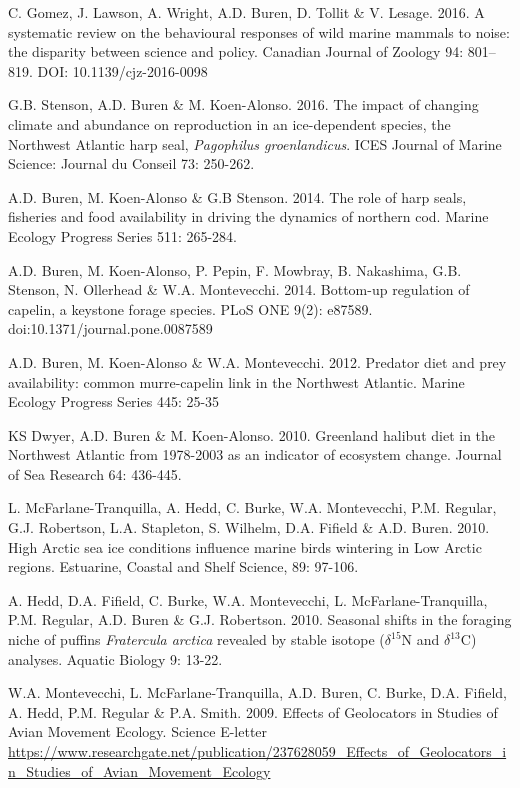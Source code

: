 \documentclass{res}
\begin{document}
\begin{resume}
\begin{hangparas}{.4in}{1}
C. Gomez, J. Lawson, A. Wright, A.D. Buren, D. Tollit \& V. Lesage. 2016. A systematic review on the behavioural responses of wild marine mammals to noise: the disparity between science and policy. Canadian Journal of Zoology 94: 801–819. DOI: 10.1139/cjz-2016-0098

\pagebreak

G.B. Stenson, A.D. Buren \& M. Koen-Alonso. 2016. The impact of changing climate and abundance on reproduction in an ice-dependent species, the Northwest Atlantic harp seal, \textit{Pagophilus groenlandicus}. ICES Journal of Marine Science: Journal du Conseil 73: 250-262.

A.D. Buren, M. Koen-Alonso \& G.B Stenson. 2014. The role of harp seals, fisheries and food availability in driving the dynamics of northern cod. Marine Ecology Progress Series 511: 265-284.

A.D. Buren, M. Koen-Alonso, P. Pepin, F. Mowbray, B. Nakashima, G.B. Stenson, N. Ollerhead \& W.A. Montevecchi. 2014. Bottom-up regulation of capelin, a keystone forage species. PLoS ONE 9(2): e87589. doi:10.1371/journal.pone.0087589

A.D. Buren, M. Koen-Alonso \& W.A. Montevecchi. 2012. Predator diet and prey availability: common murre-capelin link in the Northwest Atlantic. Marine Ecology Progress Series 445: 25-35

KS Dwyer, A.D. Buren \& M. Koen-Alonso. 2010. Greenland halibut diet in the Northwest Atlantic from 1978-2003 as an indicator of ecosystem change. Journal of Sea Research 64: 436-445. 

L. McFarlane-Tranquilla, A. Hedd, C. Burke, W.A. Montevecchi, P.M. Regular, G.J. Robertson, L.A. Stapleton, S. Wilhelm, D.A. Fifield \& A.D. Buren. 2010. High Arctic sea ice conditions influence marine birds wintering in Low Arctic regions. Estuarine, Coastal and Shelf Science, 89: 97-106.

A. Hedd, D.A. Fifield, C. Burke, W.A. Montevecchi, L. McFarlane-Tranquilla, P.M. Regular, A.D. Buren \& G.J. Robertson. 2010. Seasonal shifts in the foraging niche of puffins \textit{Fratercula arctica} revealed by stable isotope ($\delta^{15}$N and $\delta^{13}$C) analyses. Aquatic Biology 9: 13-22.

W.A. Montevecchi, L. McFarlane-Tranquilla, A.D. Buren, C. Burke, D.A. Fifield, A. Hedd, P.M. Regular \& P.A. Smith. 2009. Effects of Geolocators in Studies of Avian Movement Ecology. Science E-letter \url{https://www.researchgate.net/publication/237628059_Effects_of_Geolocators_in_Studies_of_Avian_Movement_Ecology}


\end{hangparas}
\end{resume}
\end{document}
